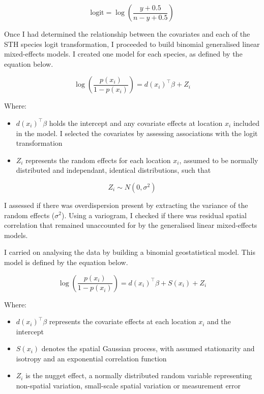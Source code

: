 \documentclass[
]{article}
\providecommand{\tightlist}{%
  \setlength{\itemsep}{0pt}\setlength{\parskip}{0pt}}
\begin{document}
\[ \text{logit} = \log\left(\frac{y+0.5}{n-y+0.5}\right) \]

Once I had determined the relationship between the covariates and each
of the STH species logit transformation, I proceeded to build binomial
generalised linear mixed-effects models. I created one model for each
species, as defined by the equation below.

\[ \log\left(\frac{p(x_i)}{1-p(x_i)}\right) = d(x_i)^\intercal\beta + Z_i \]

Where:

\begin{itemize}
\tightlist
\item
  \(d(x_i)^\intercal\beta\) holds the intercept and any covariate
  effects at location \(x_i\) included in the model. I selected the
  covariates by assessing associations with the logit transformation
\item
  \(Z_i\) represents the random effects for each location \(x_i\),
  assumed to be normally distributed and independant, identical
  distributions, such that
\end{itemize}

\[ Z_i \sim N(0, \sigma^2)  \]

I assessed if there was overdispersion present by extracting the
variance of the random effects (\(\sigma^2\)). Using a variogram, I
checked if there was residual spatial correlation that remained
unaccounted for by the generalised linear mixed-effects models.

I carried on analysing the data by building a binomial geostatistical
model. This model is defined by the equation below.

\[ \log\left(\frac{p(x_i)}{1-p(x_i)}\right) = d(x_i)^\intercal\beta + S(x_i) + Z_i \]

Where:

\begin{itemize}
\tightlist
\item
  \(d(x_i)^\intercal\beta\) represents the covariate effects at each
  location \(x_i\) and the intercept
\item
  \(S(x_i)\) denotes the spatial Gaussian process, with assumed
  stationarity and isotropy and an exponential correlation function
\item
  \(Z_i\) is the nugget effect, a normally distributed random variable
  representing non-spatial variation, small-scale spatial variation or
  measurement error
\end{itemize}
\end{document}
